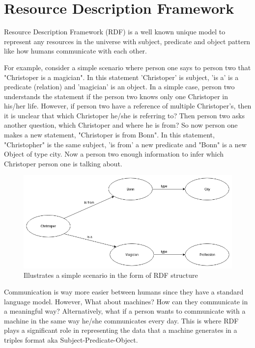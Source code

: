 
	\section{Resource Description Framework}

	Resource Description Framework (RDF) is a well known unique model to represent any resources in the universe with subject, predicate and object pattern like how humans communicate with each other.
	
	For example, consider a simple scenario where person one says to person two that "Christoper is a magician". In this statement 'Christoper' is subject, 'is a' is a predicate (relation) and 'magician' is an object. In a simple case, person two understands the statement if the person two knows only one Christoper in his/her life. However, if person two have a reference of multiple Christoper's, then it is unclear that which Christoper he/she is referring to? Then person two asks another question, which Christoper and where he is from? So now person one makes a new statement, "Christoper is from Bonn". In this statement, "Christopher" is the same subject, 'is from' a new predicate and "Bonn" is a new Object of type city. Now a person two enough information to infer which Christoper person one is talking about.
	
	\begin{figure}[!htbp] 
		\begin{center}
			\includegraphics[scale=0.5]{./images/png/rdf/uml_example}	
			\caption{Illustrates a simple scenario in the form of RDF structure}	
			\label{fig:uml_example}	
		\end{center}
	\end{figure}

	Communication is way more easier between humans since they have a standard language model. However, What about machines? How can they communicate in a meaningful way? Alternatively, what if a person wants to communicate with a machine in the same way he/she communicates every day. This is where RDF plays a significant role in representing the data that a machine generates in a triples format aka Subject-Predicate-Object.
	
